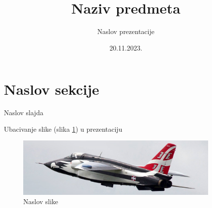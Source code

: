 \documentclass[12pt]{beamer}
\title[Naziv predmeta]{Naziv predmeta} %
\subtitle{Naslov prezentacije} %
\date{20.11.2023.} %
\institute[Katedra za vazduhoplovstvo]{\textbf{Katedra za vazduhoplovstvo} \\ Mašinski fakultet \\ Univerziteta u Beogradu}
\begin{document}
{
	\maketitle
}
\addtocounter{framenumber}{-1} %

\section{Naslov sekcije}

\begin{frame}{Naslov slajda}

Ubacivanje slike (slika \ref{orao}) u prezentaciju %

\begin{figure}
    \centering
    \includegraphics[width=0.9\textwidth]{orao}
    \caption{Naslov slike}
    \label{orao}
\end{figure}
\end{frame}
\end{document}
